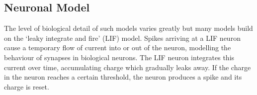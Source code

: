 \subsection{Neuronal Model}
The level of biological detail of such models varies greatly but many models build on the `leaky integrate and fire' (LIF) model.
Spikes arriving at a LIF neuron cause a temporary flow of current into or out of the neuron, modelling the behaviour of synapses in biological neurons.
The LIF neuron integrates this current over time, accumulating charge which gradually leaks away. If the charge in the neuron reaches a certain threshold, the neuron produces a spike and its charge is reset. 
% 
%
%
